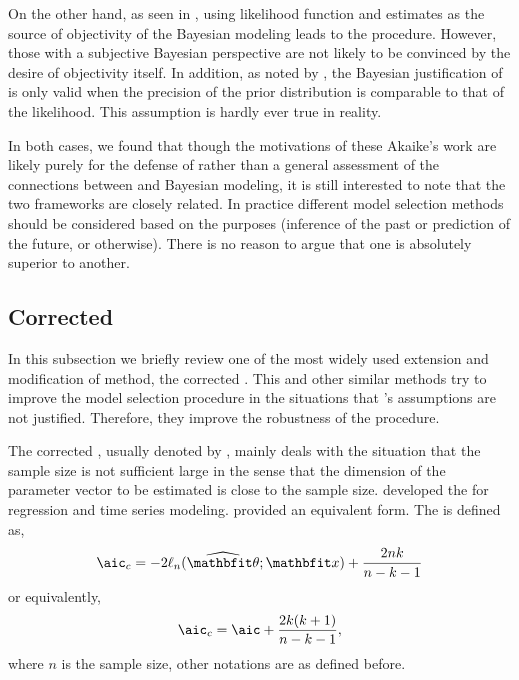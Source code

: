 On the other hand, as seen in \textcite{Akaike1980}, using likelihood function
and \aic estimates as the source of objectivity of the Bayesian modeling leads
to the \bic procedure. However, those with a subjective Bayesian perspective
are not likely to be convinced by the desire of objectivity itself. In
addition, as noted by \textcite{Kass1995}, the Bayesian justification of \aic
is only valid when the precision of the prior distribution is comparable to
that of the likelihood. This assumption is hardly ever true in reality.

In both cases, we found that though the motivations of these Akaike's work are
likely purely for the defense of \aic rather than a general assessment of the
connections between \aic and Bayesian modeling, it is still interested to note
that the two frameworks are closely related. In practice different model
selection methods should be considered based on the purposes (inference of the
past or prediction of the future, or otherwise). There is no reason to argue
that one is absolutely superior to another.

\firstyear
\subsection{Corrected \protect\aic}
\label{sub:Corrected aic}

In this subsection we briefly review one of the most widely used extension and
modification of \aic method, the corrected \aic. This and other similar
methods try to improve the model selection procedure in the situations that
\textcite{Akaike1973}'s assumptions are not justified. Therefore, they improve
the robustness of the \aic procedure.

The corrected \aic, usually denoted by \aicc, mainly deals with the situation
that the sample size is not sufficient large in the sense that the dimension
of the parameter vector to be estimated is close to the sample size.
\textcite{Hurvich1989} developed the \aicc for regression and time series
modeling. \textcite{Sugiura1978} provided an equivalent form. The \aicc is
defined as,
\begin{equation}
  \text{\aicc} = -2\ell_n(\hbth;\bfx) + \frac{2nk}{n-k-1}
\end{equation}
or equivalently,
\begin{equation}
  \text{\aicc} = \text{\aic} + \frac{2k(k+1)}{n-k-1},
\end{equation}
where $n$ is the sample size, other notations are as defined before.

